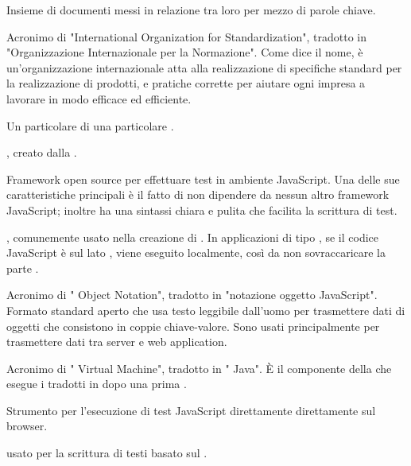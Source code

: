 {Insieme di documenti messi in relazione tra loro per mezzo di parole chiave.} 

{Acronimo di "International Organization for Standardization", tradotto in "Organizzazione Internazionale per la Normazione". Come dice il nome, è un'organizzazione internazionale atta alla realizzazione di specifiche standard per la realizzazione di prodotti,  e pratiche corrette per aiutare ogni impresa a lavorare in modo efficace ed efficiente.}

{Un particolare  di una particolare .}




{ , creato dalla .}

{Framework open source per effettuare test in ambiente JavaScript. Una delle sue caratteristiche principali è il fatto di non dipendere da nessun altro framework JavaScript; inoltre ha una sintassi chiara e pulita che facilita la scrittura di test.}

{ , comunemente usato nella creazione di . In applicazioni di tipo , se il codice JavaScript è sul lato , viene eseguito localmente, così da non sovraccaricare la parte .}

{Acronimo di " Object Notation", tradotto in "notazione oggetto JavaScript". Formato standard aperto che usa testo leggibile dall'uomo per trasmettere dati di oggetti che consistono in coppie chiave-valore. Sono usati principalmente per trasmettere dati tra server e web application.}

{Acronimo di " Virtual Machine", tradotto in " Java". \`{E} il componente della  che esegue i  tradotti in  dopo una prima .}

{Strumento per l'esecuzione di test JavaScript direttamente direttamente sul browser.}



{ usato per la scrittura di testi basato sul  .}


